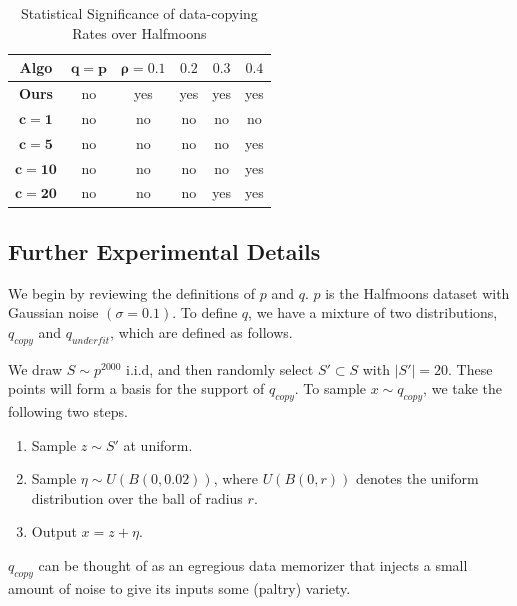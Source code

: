 \begin{table}[h]
\caption{Statistical Significance of data-copying Rates over Halfmoons} \label{results}
\begin{center}
\begin{tabular}{ |c||c|c|c|c|c| } 
 \hline
 \textbf{Algo} & $\mathbf{q = p}$ & $\mathbf{\rho = 0.1}$ & $\mathbf{0.2}$ & $\mathbf{0.3}$ & $\mathbf{0.4}$ \\ 
 \hline
 \hline
 \textbf{Ours} & \color{blue}no & \color{red}yes & \color{red}yes & \color{red}yes & \color{red}yes \\ 
 \hline
 $\mathbf{c=1}$ & \color{blue}no & \color{blue}no & \color{blue}no & \color{blue}no & \color{blue}no \\ 
 \hline
 $\mathbf{c=5}$ & \color{blue}no & \color{blue}no & \color{blue}no & \color{blue}no & \color{red}yes \\ 
 \hline
 $\mathbf{c=10}$ & \color{blue}no & \color{blue}no & \color{blue}no & \color{blue}no & \color{red}yes \\ 
 \hline
 $\mathbf{c=20}$ & \color{blue}no & \color{blue}no& \color{blue}no & \color{red}yes & \color{red}yes\\ 
 \hline
\end{tabular}
\end{center}
\end{table}

 \subsection{Further Experimental Details}\label{sec:experiments_details}

We begin by reviewing the definitions of $p$ and $q$. $p$ is the Halfmoons dataset with Gaussian noise $(\sigma = 0.1)$. To define $q$, we have a mixture of two distributions, $q_{copy}$ and $q_{underfit}$, which are defined as follows.

We draw $S \sim p^{2000}$ i.i.d, and then randomly select $S' \subset S$ with $|S'| = 20$. These points will form a basis for the support of $q_{copy}$. To sample $x \sim q_{copy}$, we take the following two steps.
\begin{enumerate}
	\item Sample $z \sim S'$ at uniform.
	\item Sample $\eta \sim U(B(0, 0.02))$, where $U(B(0, r))$ denotes the uniform distribution over the ball of radius $r$. 
	\item Output $x = z + \eta$.
\end{enumerate}
$q_{copy}$ can be thought of as an egregious data memorizer that injects a small amount of noise to give its inputs some (paltry) variety. 

